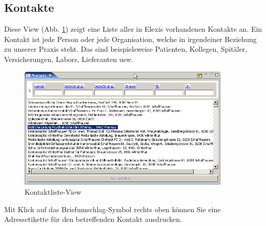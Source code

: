 \subsection{Kontakte}
Diese View (Abb. \ref{fig:kontaktlist}) zeigt eine Liste aller in Elexis
vorhandenen Kontakte an. Ein Kontakt
ist jede Person oder jede Organisation, welche in irgendeiner Beziehung zu
unserer Praxis steht. Das sind beispielsweise Patienten, Kollegen, Spitäler,
Versicherungen, Labors, Lieferanten usw.
\begin{figure}[htp]
\begin{center}
  \includegraphics[width=0.9\textwidth]{images/kontaktlistview}
  \caption{Kontaktliste-View}
  \label{fig:kontaktlist}
\end{center}
\end{figure}
Mit Klick auf das Briefumschlag-Symbol rechts oben können Sie eine
Adressetikette für den betreffenden Kontakt ausdrucken.

